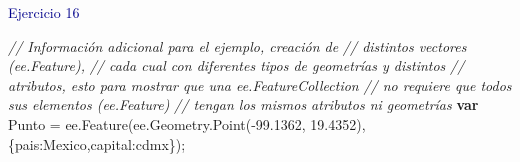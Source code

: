 \documentclass[
  12pt,
  letterpaper,
  twoside]{book}
\newenvironment{Shaded}{\begin{snugshade}}{\end{snugshade}}
\newcommand{\AttributeTok}[1]{\textcolor[rgb]{0.48,0.12,0.64}{#1}}
\newcommand{\CommentTok}[1]{\textcolor[rgb]{0.24,0.58,0.00}{\textit{#1}}}
\newcommand{\ControlFlowTok}[1]{\textcolor[rgb]{0.00,0.00,0.00}{\textbf{#1}}}
\newcommand{\DataTypeTok}[1]{\textcolor[rgb]{0.00,0.00,0.00}{#1}}
\newcommand{\FloatTok}[1]{\textcolor[rgb]{0.28,0.53,0.93}{#1}}
\newcommand{\FunctionTok}[1]{\textcolor[rgb]{0.48,0.12,0.64}{#1}}
\newcommand{\KeywordTok}[1]{\textcolor[rgb]{0.48,0.12,0.64}{#1}}
\newcommand{\NormalTok}[1]{#1}
\newcommand{\OperatorTok}[1]{\textcolor[rgb]{0.00,0.00,0.00}{#1}}
\newcommand{\StringTok}[1]{\textcolor[rgb]{0.87,0.29,0.22}{#1}}
\begin{document}
\textcolor{darkblue}{Ejercicio 16}

\begin{Shaded}
\begin{Highlighting}[]
\CommentTok{// Información adicional para el ejemplo, creación de }
\CommentTok{// distintos vectores (ee.Feature),}
\CommentTok{// cada cual con diferentes tipos de geometrías y distintos}
\CommentTok{// atributos, esto para mostrar que una ee.FeatureCollection }
\CommentTok{// no requiere que todos sus elementos (ee.Feature)}
\CommentTok{// tengan los mismos atributos ni geometrías}
\ControlFlowTok{var}\NormalTok{ Punto }\OperatorTok{=} \KeywordTok{ee}\OperatorTok{.}\FunctionTok{Feature}\NormalTok{(}\KeywordTok{ee}\OperatorTok{.}\AttributeTok{Geometry}\OperatorTok{.}\FunctionTok{Point}\NormalTok{(}\OperatorTok{{-}}\FloatTok{99.1362}\OperatorTok{,} \FloatTok{19.4352}\NormalTok{)}\OperatorTok{,}
\NormalTok{    \{}\DataTypeTok{pais}\OperatorTok{:}\StringTok{\textquotesingle{}Mexico\textquotesingle{}}\OperatorTok{,}\DataTypeTok{capital}\OperatorTok{:}\StringTok{\textquotesingle{}cdmx\textquotesingle{}}\NormalTok{\})}\OperatorTok{;}


\end{Highlighting}
\end{Shaded}
\end{document}
